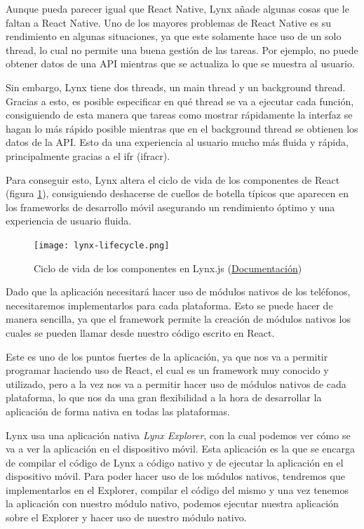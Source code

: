 Aunque pueda parecer igual que React Native, Lynx añade algunas cosas que le faltan a React Native. Uno de los mayores problemas de React Native es su rendimiento en algunas situaciones, ya que este solamente hace uso de un solo thread, lo cual no permite una buena gestión de las tareas. Por ejemplo, no puede obtener datos de una API mientras que se actualiza lo que se muestra al usuario.

Sin embargo, Lynx tiene dos threads, un main thread y un background thread.
Gracias a esto, es posible especificar en qué thread se va a ejecutar cada función, consiguiendo de esta manera que tareas como mostrar rápidamente la interfaz se hagan lo más rápido posible mientras que en el background thread se obtienen los datos de la API.
Esto da una experiencia al usuario mucho más fluida y rápida, principalmente gracias a el \gls{ifr} (\acrshort{ifracr}).

Para conseguir esto, Lynx altera el ciclo de vida de los componentes de React (figura \ref{fig:lynx-component-lifecycle}), consiguiendo deshacerse de cuellos de botella típicos que aparecen en los frameworks de desarrollo móvil asegurando un rendimiento óptimo y una experiencia de usuario fluida.

\begin{figure}[h]
    \begin{center}
        \texttt{[image: lynx-lifecycle.png]}
    \end{center}
    \caption{Ciclo de vida de los componentes en Lynx.js (\href{https://lynxjs.org/react/lifecycle.html}{Documentación})}
    \label{fig:lynx-component-lifecycle}
\end{figure}


Dado que la aplicación necesitará hacer uso de módulos nativos de los teléfonos, necesitaremos implementarlos para cada plataforma.
Esto se puede hacer de manera sencilla, ya que el framework permite la creación de módulos nativos los cuales se pueden llamar desde nuestro código escrito en React.

Este es uno de los puntos fuertes de la aplicación, ya que nos va a permitir programar haciendo uso de React, el cual es un framework muy conocido y utilizado, pero a la vez nos va a permitir hacer uso de módulos nativos de cada plataforma, lo que nos da una gran flexibilidad a la hora de desarrollar la aplicación de forma nativa en todas las plataformas.

Lynx usa una aplicación nativa \textit{Lynx Explorer}, con la cual podemos ver cómo se va a ver la aplicación en el dispositivo móvil. Esta aplicación es la que se encarga de compilar el código de Lynx a código nativo y de ejecutar la aplicación en el dispositivo móvil.
Para poder hacer uso de los módulos nativos, tendremos que implementarlos en el Explorer, compilar el código del mismo y una vez tenemos la aplicación con nuestro módulo nativo, podemos ejecutar nuestra aplicación sobre el Explorer y hacer uso de nuestro módulo nativo.

